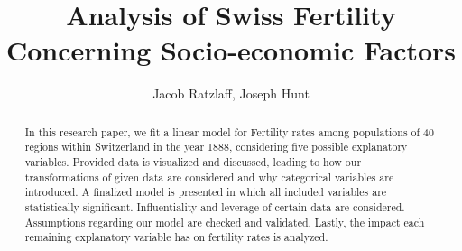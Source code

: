 \documentclass[preprint,12pt]{elsarticle}
\begin{document}
\begin{frontmatter}


\title{Analysis of Swiss Fertility Concerning Socio-economic Factors}




\author{Jacob Ratzlaff, Joseph Hunt}

\address{Colorado School of Mines}

\begin{abstract}
In this research paper, we fit a linear model for Fertility rates among populations of 40 regions within Switzerland in the year 1888, considering five possible explanatory variables. Provided data is visualized and discussed, leading to how our transformations of given data are considered and why categorical variables are introduced. A finalized model is presented in which all included variables are statistically significant. Influentiality and leverage of certain data are considered. Assumptions regarding our model are checked and validated. Lastly, the impact each remaining explanatory variable has on fertility rates is analyzed.
\end{abstract}



\end{frontmatter}
\end{document}
